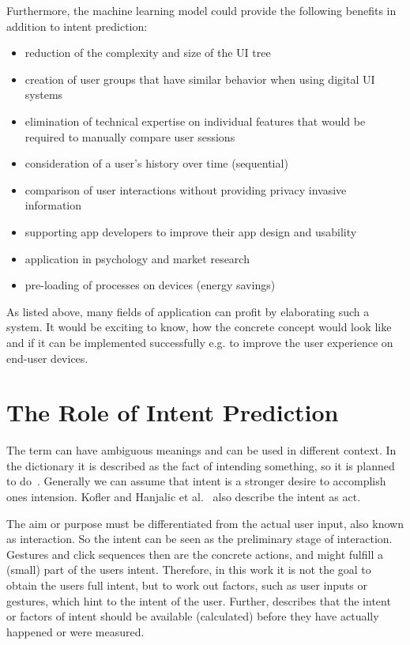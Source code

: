 Furthermore, the machine learning model could provide the following benefits in addition to intent prediction:
\begin{itemize}
    \item reduction of the complexity and size of the UI tree
    \item creation of user groups that have similar behavior when using digital UI systems \cite{jayarajah2015need}
    \item elimination of technical expertise on individual features that would be required to manually compare user sessions \cite{ghods2019activity2vec}
    \item consideration of a user's history over time (sequential)
    \item comparison of user interactions without providing privacy invasive information
    \item supporting app developers to improve their app design and usability
    \item application in psychology and market research
    \item pre-loading of processes on devices (energy savings) \cite{shen2019deepapp}
\end{itemize}

As listed above, many fields of application can profit by elaborating such a system.
It would be exciting to know, how the concrete concept would look like and if it can be implemented successfully e.g. to improve the user experience on end-user devices.


\section{The Role of Intent Prediction}
\label{sec:role-intent-prediction}

The term  can have ambiguous meanings and can be used in different context.
In the dictionary it is described as the fact of intending something, so it is planned to do~\cite{dictionaryIntent}.
Generally we can assume that intent is a stronger desire to accomplish ones intension.
Kofler and Hanjalic et al.~\cite{kofler2016user} also describe the intent as  act.

The aim or purpose must be differentiated from the actual user input, also known as interaction.
So the intent can be seen as the preliminary stage of interaction.
Gestures and click sequences then are the concrete actions, and might fulfill a (small) part of the users intent.
Therefore, in this work it is not the goal to obtain the users full intent, but to work out factors, such as user inputs or gestures, which hint to the intent of the user.
Further,  describes that the intent or factors of intent should be available (calculated) before they have actually happened or were measured.


